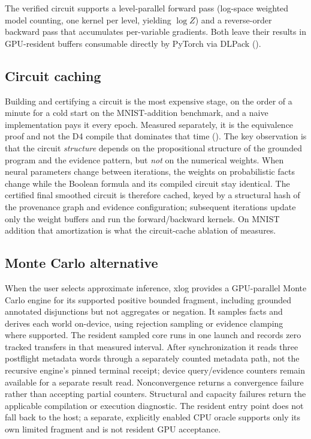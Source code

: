 The verified circuit supports a level-parallel forward pass (log-space weighted model counting, one kernel per level, yielding $\log Z$) and a reverse-order backward pass that accumulates per-variable gradients. Both leave their results in GPU-resident buffers consumable directly by PyTorch via DLPack ().

\subsection{Circuit caching}

Building and certifying a circuit is the most expensive stage, on the order of a minute for a cold start on the MNIST-addition benchmark, and a naive implementation pays it every epoch. Measured separately, it is the equivalence proof and not the D4 compile that dominates that time (). The key observation is that the circuit \emph{structure} depends on the propositional structure of the grounded program and the evidence pattern, but \emph{not} on the numerical weights. When neural parameters change between iterations, the weights on probabilistic facts change while the Boolean formula and its compiled circuit stay identical. The certified final smoothed circuit is therefore cached, keyed by a structural hash of the provenance graph and evidence configuration; subsequent iterations update only the weight buffers and run the forward/backward kernels. On MNIST addition that amortization is what the circuit-cache ablation of  measures.

\subsection{Monte Carlo alternative}

When the user selects approximate inference, xlog provides a GPU-parallel Monte Carlo engine for its supported positive bounded fragment, including grounded annotated disjunctions but not aggregates or negation. It samples facts and derives each world on-device, using rejection sampling or evidence clamping where supported. The resident sampled core runs in one launch and records zero tracked transfers in that measured interval. After synchronization it reads three postflight metadata words through a separately counted metadata path, not the recursive engine's pinned terminal receipt; device query/evidence counters remain available for a separate result read. Nonconvergence returns a convergence failure rather than accepting partial counters. Structural and capacity failures return the applicable compilation or execution diagnostic. The resident entry point does not fall back to the host; a separate, explicitly enabled CPU oracle supports only its own limited fragment and is not resident GPU acceptance.
